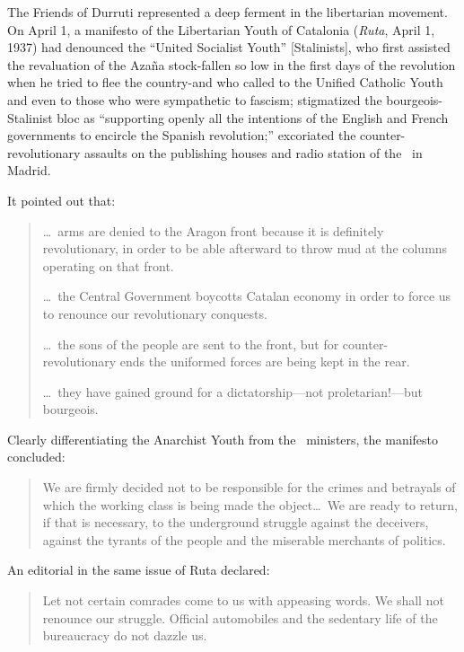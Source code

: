 The Friends of Durruti represented a deep ferment in the libertarian movement. On April 1, a manifesto of the Libertarian Youth of Catalonia (\emph{Ruta}, April 1, 1937) had denounced the ``United Socialist Youth'' [Stalinists], who first assisted the revaluation of the Azaña stock-fallen so low in the first days of the revolution when he tried to flee the country-and who called to the Unified Catholic Youth and even to those who were sympathetic to fascism; stigmatized the bourgeois-Stalinist bloc as ``supporting openly all the intentions of the English and French governments to encircle the Spanish revolution;'' excoriated the counter-revolutionary assaults on the publishing houses and radio station of the \POUM\ in Madrid. 

It pointed out that:

\begin{quotation}
  \dots\ arms are denied to the Aragon front because it is definitely revolutionary, in order to be able afterward to throw mud at the columns operating on that front.
	
  \dots\ the Central Government boycotts Catalan economy in order to force us to renounce our revolutionary conquests.
	
  \dots\ the sons of the people are sent to the front, but for counter-revolutionary ends the uniformed forces are being kept in the rear.
  
  \dots\ they have gained ground for a dictatorship---not pro\-le\-ta\-ri\-an!---but bourgeois.
\end{quotation}

Clearly differentiating the Anarchist Youth from the \CNT\ ministers, the manifesto concluded:

\begin{quotation}
  We are firmly decided not to be responsible for the crimes and betrayals of which the working class is being made the object\dots\ We are ready to return, if that is necessary, to the underground struggle against the deceivers, against the tyrants of the people and the miserable merchants of politics.
\end{quotation}

An editorial in the same issue of Ruta declared:

\begin{quotation}
  Let not certain comrades come to us with appeasing words. We shall not renounce our struggle. Official automobiles and the sedentary life of the bureaucracy do not dazzle us.
\end{quotation} 

